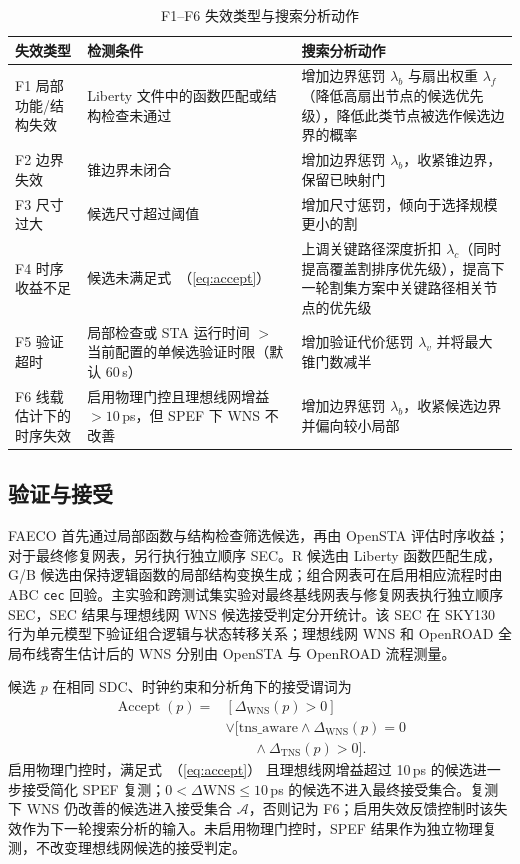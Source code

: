 \documentclass[twocolumn,10pt,fontset=windows]{ctexart}
\renewcommand{\eqref}[1]{\textup{（\ref{#1}）}}
\begin{document}
\begin{table}[!htbp]
\centering
\caption{F1--F6 失效类型与搜索分析动作}
\label{tab:failures}
\scriptsize
\setlength{\tabcolsep}{2pt}
\begin{tabular}{p{2.0cm}p{2.6cm}p{2.9cm}}
\toprule
\textbf{失效类型} & \textbf{检测条件} & \textbf{搜索分析动作} \\
\midrule
F1 局部功能/结构失效 & Liberty 文件中的函数匹配或结构检查未通过 & 增加边界惩罚 $\lambda_b$ 与扇出权重 $\lambda_f$（降低高扇出节点的候选优先级），降低此类节点被选作候选边界的概率 \\
F2 边界失效 & 锥边界未闭合 & 增加边界惩罚 $\lambda_b$，收紧锥边界，保留已映射门 \\
F3 尺寸过大 & 候选尺寸超过阈值 & 增加尺寸惩罚，倾向于选择规模更小的割 \\
F4 时序收益不足 & 候选未满足式~\eqref{eq:accept} & 上调关键路径深度折扣 $\lambda_c$（同时提高覆盖割排序优先级），提高下一轮割集方案中关键路径相关节点的优先级 \\
F5 验证超时 & 局部检查或 STA 运行时间 $>$ 当前配置的单候选验证时限（默认 $60\,$s） & 增加验证代价惩罚 $\lambda_v$ 并将最大锥门数减半 \\
F6 线载估计下的时序失效 & 启用物理门控且理想线网增益 $>10\,$ps，但 SPEF 下 WNS 不改善 & 增加边界惩罚 $\lambda_b$，收紧候选边界并偏向较小局部 \\
\bottomrule
\end{tabular}
\end{table}

\subsection{验证与接受}\label{sec:validation}
FAECO 首先通过局部函数与结构检查筛选候选，再由 OpenSTA 评估时序收益；对于最终修复网表，另行执行独立顺序 SEC。R 候选由 Liberty 函数匹配生成，G/B 候选由保持逻辑函数的局部结构变换生成；组合网表可在启用相应流程时由 ABC \texttt{cec} 回验。主实验和跨测试集实验对最终基线网表与修复网表执行独立顺序 SEC，SEC 结果与理想线网 WNS 候选接受判定分开统计。该 SEC 在 SKY130 行为单元模型下验证组合逻辑与状态转移关系；理想线网 WNS 和 OpenROAD 全局布线寄生估计后的 WNS 分别由 OpenSTA 与 OpenROAD 流程测量。

候选 $p$ 在相同 SDC、时钟约束和分析角下的接受谓词为
\begin{equation}
\label{eq:accept}
\begin{aligned}
\operatorname{Accept}(p)={}&[\Delta_{\mathrm{WNS}}(p)>0]\\
&\lor[\mathrm{tns\_aware}\land\Delta_{\mathrm{WNS}}(p)=0\\
&\qquad\land\Delta_{\mathrm{TNS}}(p)>0].
\end{aligned}
\end{equation}
启用物理门控时，满足式~\eqref{eq:accept} 且理想线网增益超过 10\,ps 的候选进一步接受简化 SPEF 复测；$0<\Delta\mathrm{WNS}\le10\,$ps 的候选不进入最终接受集合。复测下 WNS 仍改善的候选进入接受集合 $\mathcal{A}$，否则记为 F6；启用失效反馈控制时该失效作为下一轮搜索分析的输入。未启用物理门控时，SPEF 结果作为独立物理复测，不改变理想线网候选的接受判定。
\end{document}
